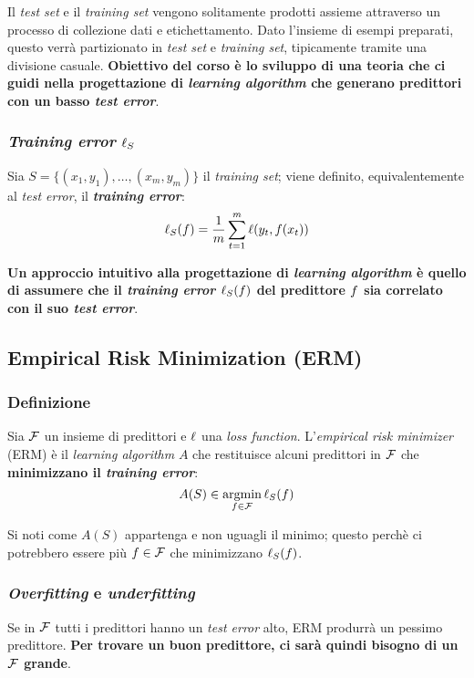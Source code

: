 \begin{figure}[h]
    \centering
    
\end{figure}

Il \textit{test set} e il \textit{training set} vengono solitamente prodotti assieme
attraverso un processo di collezione dati e etichettamento. Dato l'insieme di esempi
preparati, questo verrà partizionato in \textit{test set} e \textit{training set},
tipicamente tramite una divisione casuale. \textbf{Obiettivo del corso è lo sviluppo
di una teoria che ci guidi nella progettazione di \textit{learning algorithm} che
generano predittori con un basso \textit{test error}}.

\subsubsection{\textit{Training error} \texorpdfstring{$\ell_S$}{l}}
Sia $S = \{(x_1,y_1),\dots,(x_m,y_m)\}$ il \textit{training set}; viene definito,
equivalentemente al \textit{test error}, il \textbf{\textit{training error}}:
$$ \ell_S(f) = \frac{1}{m}\sum_{t=1}^m \ell(y_t,f(x_t)) $$

\textbf{Un approccio intuitivo alla progettazione di \textit{learning algorithm} è 
quello di assumere che il \textit{training error} $\ell_S(f)$ del predittore 
$f$ sia correlato con il suo \textit{test error}}.

\subsection{Empirical Risk Minimization (ERM)}
\subsubsection{Definizione}
Sia $\mathcal{F}$ un insieme di predittori e $\ell$ una \textit{loss function}.
L'\textit{empirical risk minimizer} (ERM) è il \textit{learning algorithm} $A$
che restituisce alcuni predittori in $\mathcal{F}$ che \textbf{minimizzano il 
\textit{training error}}:
$$ A(S) \in \operatorname*{argmin}_{f \in \mathcal{F}} \ell_S(f) $$

Si noti come $A(S)$ appartenga e non uguagli il minimo; questo perchè ci 
potrebbero essere più $f \in \mathcal{F}$ che minimizzano $\ell_S(f)$.

\subsubsection{\textit{Overfitting} e \textit{underfitting}}
Se in $\mathcal{F}$ tutti i predittori hanno un \textit{test error} alto, ERM produrrà
un pessimo predittore. \textbf{Per trovare un buon predittore, ci sarà quindi
bisogno di un $\mathcal{F}$ grande}.

